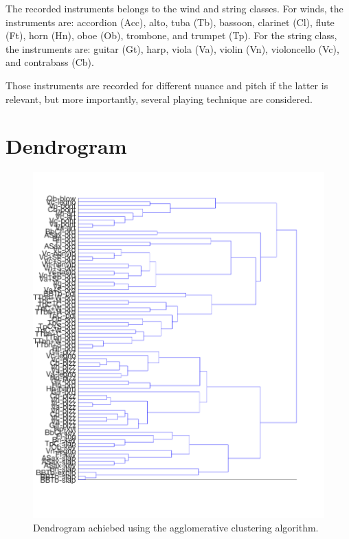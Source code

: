 \documentclass{article}
\begin{document}
The recorded instruments belongs to the wind and string classes. For winds, the instruments are: accordion (Acc), alto, tuba (Tb), bassoon, clarinet (Cl), flute (Ft), horn (Hn), oboe (Ob), trombone, and trumpet (Tp). For the string class, the instruments are: guitar (Gt), harp, viola (Va), violin (Vn), violoncello (Vc), and contrabass (Cb).

Those instruments are recorded for different nuance and pitch if the latter is relevant, but more importantly, several playing technique are considered.

\section{Dendrogram}


\begin{figure}
\center
\includegraphics[width = \textwidth]{figures/allLinkage.png}
\caption{Dendrogram achiebed using the agglomerative clustering algorithm.}
\label{fig:dendrogram}
\end{figure}

%
%
%
%
\end{document}
